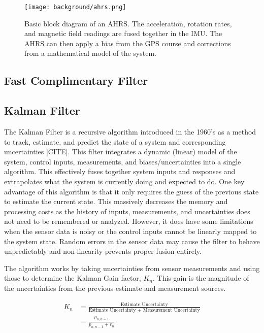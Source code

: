 \begin{figure}[h!]
    \caption[AHRS block diagram]{Basic block diagram of an AHRS. 
    The acceleration, rotation rates, and magnetic field readings are fused together in the IMU. 
    The AHRS can then apply a bias from the GPS course and corrections from a mathematical model of the system.}
    \label{fig:ahrs_design}
    \centering
    \texttt{[image: background/ahrs.png]}
\end{figure}

\subsection{Fast Complimentary Filter} \label{ssec:complimentary_filter}

\subsection{Kalman Filter} \label{ssec:kalman_filter}
The Kalman Filter is a recursive algorithm introduced in the 1960's as a method to track, estimate, and predict the state of a system and corresponding uncertainties [CITE].
This filter integrates a dynamic (linear) model of the system, control inputs, measurements, and biases/uncertainties into a single algorithm.
This effectively fuses together system inputs and responses and extrapolates what the system is currently doing and expected to do.
One key advantage of this algorithm is that it only requires the guess of the previous state to estimate the current state. 
This massively decreases the memory and processing costs as the history of inputs, measurements, and uncertainties does not need to be remembered or analyzed.
However, it does have some limitations when the sensor data is noisy or the control inputs cannot be linearly mapped to the system state.
Random errors in the sensor data may cause the filter to behave unpredictably and non-linearity prevents proper fusion entirely.

The algorithm works by taking uncertainties from sensor measurements and using those to determine the Kalman Gain factor, $K_n$.
This gain is the magnitude of the uncertainties from the previous estimate and measurement sources.

\begin{equation} \label{eq:kalman_gain}
    \begin{aligned}
        K_n &= \frac{\text{Estimate Uncertainty}}{\text{Estimate Uncertainty + Measurement Uncertainty}} \\
            &= \frac{p_{n,n-1}}{p_{n,n-1} + r_n}
    \end{aligned}
\end{equation}

